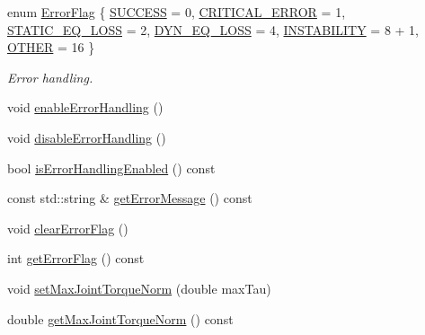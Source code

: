 \begin{DoxyCompactItemize}
\item 
enum \hyperlink{classocra_1_1Controller_abeaf3673abe2da79493638dcc49fcf6e}{Error\+Flag} \{ \newline
\hyperlink{classocra_1_1Controller_abeaf3673abe2da79493638dcc49fcf6eaf0c456fccd7111235e41d752e78d4e3d}{S\+U\+C\+C\+E\+SS} = 0, 
\hyperlink{classocra_1_1Controller_abeaf3673abe2da79493638dcc49fcf6eaa6ea1ed92f7f3f1278fb8bbf11a13d77}{C\+R\+I\+T\+I\+C\+A\+L\+\_\+\+E\+R\+R\+OR} = 1, 
\hyperlink{classocra_1_1Controller_abeaf3673abe2da79493638dcc49fcf6ea2c4995e7abb68ab3a51e2052609d0f46}{S\+T\+A\+T\+I\+C\+\_\+\+E\+Q\+\_\+\+L\+O\+SS} = 2, 
\hyperlink{classocra_1_1Controller_abeaf3673abe2da79493638dcc49fcf6eadb8ddca8cd6373851537d1c719f04c97}{D\+Y\+N\+\_\+\+E\+Q\+\_\+\+L\+O\+SS} = 4, 
\newline
\hyperlink{classocra_1_1Controller_abeaf3673abe2da79493638dcc49fcf6ea7dc3bcb2de72c9d94bdee2a99f5957d4}{I\+N\+S\+T\+A\+B\+I\+L\+I\+TY} = 8 + 1, 
\hyperlink{classocra_1_1Controller_abeaf3673abe2da79493638dcc49fcf6ea2a5f1f9e553eccf1b3f1a26c5979c0ef}{O\+T\+H\+ER} = 16
 \}\begin{DoxyCompactList}\small\item\em Error handling. \end{DoxyCompactList}
\item 
void \hyperlink{classocra_1_1Controller_a9f9773f34022d6f7b0abf95255088f70}{enable\+Error\+Handling} ()
\item 
void \hyperlink{classocra_1_1Controller_aad44e0db3e0039bf3d6eeb3a89a99752}{disable\+Error\+Handling} ()
\item 
bool \hyperlink{classocra_1_1Controller_aa9096ed0ee671ab256085156c1a2c276}{is\+Error\+Handling\+Enabled} () const
\item 
const std\+::string \& \hyperlink{classocra_1_1Controller_a63c3529263ba2cf24f56f5998fa882b3}{get\+Error\+Message} () const
\item 
void \hyperlink{classocra_1_1Controller_a18fe6c4ad06aa7b2254ab6e4e740d101}{clear\+Error\+Flag} ()
\item 
int \hyperlink{classocra_1_1Controller_a5fdf44f2acf693f69a68cc95ce4182b4}{get\+Error\+Flag} () const
\item 
void \hyperlink{classocra_1_1Controller_a80f0b90e59759bf79fc4ff8c85ca8d85}{set\+Max\+Joint\+Torque\+Norm} (double max\+Tau)
\item 
double \hyperlink{classocra_1_1Controller_ac9a605bf14c4f70d3ba8d1c61f5c1976}{get\+Max\+Joint\+Torque\+Norm} () const

\end{DoxyCompactItemize}
